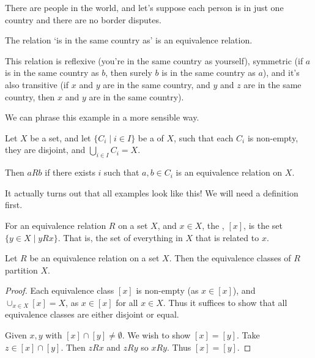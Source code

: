 \begin{example}
\begin{center}
\begin{tikzpicture}[x=0.75pt,y=0.75pt,yscale=-1,xscale=1]
\end{tikzpicture}

	\end{center}

	There are people in the world, and let's suppose each person is in just one country and there are no border disputes.

	The relation `is in the same country as' is an equivalence relation. 
	
	This relation is reflexive (you're in the same country as yourself), symmetric (if $a$ is in the same country as $b$, then surely $b$ is in the same country as $a$), and it's also transitive (if $x$ and $y$ are in the same country, and $y$ and $z$ are in the same country, then $x$ and $y$ are in the same country).
\end{example}


We can phrase this example in a more sensible way.

\begin{example}
	Let $X$ be a set, and let $\{C_i \mid i \in I \}$ be a  of $X$, such that each $C_i$ is non-empty, they are disjoint, and $\bigcup_{i \in I} C_i = X$.

	Then $a R b$ if there exists $i$ such that $a, b \in C_i$ is an equivalence relation on $X$.
\end{example}

It actually turns out that all examples look like this! We will need a definition first.

\begin{definition}
	For an equivalence relation $R$ on a set $X$, and $x \in X$, the , $[x]$, is the set $\{y \in X \mid y R x \}$. That is, the set of everything in $X$ that is related to $x$.
\end{definition}

\begin{proposition}
	Let $R$ be an equivalence relation on a set $X$. Then the equivalence classes of $R$ partition $X$.
\end{proposition}
\begin{proof}
	Each equivalence class $[x]$ is non-empty (as $x \in [x]$), and $\cup_{x \in X} [x] = X$, as $x \in [x]$ for all $x \in X$. Thus it suffices to show that all equivalence classes are either disjoint or equal.

	Given $x, y$ with $[x] \cap [y] \neq \emptyset$. We wish to show $[x] = [y]$. Take $z \in [x] \cap [y]$. Then $z R x$ and $z R y$ so $x R y$. Thus $[x] = [y]$.
\end{proof}


